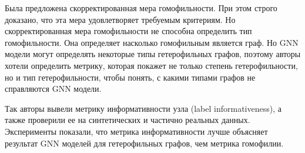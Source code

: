 \documentclass[a4paper,14pt]{article}
\begin{document}
	Была предложена скорректированная мера гомофильности. При этом строго доказано, что эта мера удовлетворяет требуемым критериям.
	Но скорректированная мера гомофильности не способна определить тип гомофильности. Она определяет насколько гомофильным является граф.
	Но GNN модели могут определять некоторые типы гетерофильных графов, поэтому авторы хотели определить метрику, которая покажет не только степень гетерофильности, но и тип гетерофильности, чтобы понять, с какими типами графов не справляются GNN модели. 
	
	Так авторы вывели метрику информативности узла (label informativeness), а также проверили ее на синтетических и частично реальных данных. Эксперименты показали, что метрика информативности лучше объясняет результат GNN моделей для гетерофильных графов, чем метрика гомофилии.

	
	
    \pagebreak
    \renewcommand{\refname}{{ \hfill СПИСОК ИСПОЛЬЗОВАННЫХ ИСТОЧНИКОВ \hfill}}
%    
    
    
    \newpage
\end{document}
